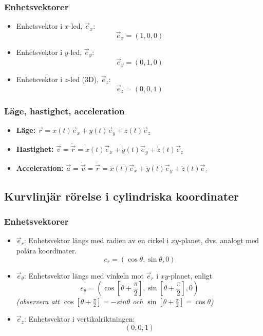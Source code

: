 \documentclass{article}
\newenvironment{ankiflashcard}[1]{}{}
\begin{document}
\begin{paracol}{2}
\subsubsection{Enhetsvektorer}
\begin{itemize}
    \item Enhetsvektor i $x$-led, $\vec e_x$:
    $$\vec e_x = (1,0,0)$$
    \item Enhetsvektor i $y$-led, $\vec e_y$:
    $$\vec e_y = (0,1,0)$$
    \item Enhetsvektor i $z$-led (3D), $\vec e_z$:
    $$\vec e_z = (0,0,1)$$ 
\end{itemize}
\subsubsection{Läge, hastighet, acceleration}

\begin{ankiflashcard}{Definera läge, hastighet och acceleration i kartesiska koordinater.}
    
\begin{itemize}
    \item \textbf{Läge:} $\vec r = x(t)\vec e_x + y(t)\vec e_y + z(t)\vec e_z$
    \item \textbf{Hastighet:} $\vec v = \dot{\vec r} = \dot x(t)\vec e_x + \dot y(t)\vec e_y + \dot z(t)\vec e_z$
    \item \textbf{Acceleration:} $\vec a = \dot{\vec v} = \ddot{\vec r} = \ddot x(t)\vec e_x + \ddot y(t)\vec e_y + \ddot z(t)\vec e_z$
\end{itemize}
\end{ankiflashcard}

\subsection{Kurvlinjär rörelse i cylindriska koordinater}

\begin{ankiflashcard}{Definiera enhetsvektorerna i cylinderkoordinater.}
\subsubsection{Enhetsvektorer}

\begin{itemize}
    \item $\vec e_r$: Enhetsvektor längs med radien av en cirkel i $xy$-planet, dvs. analogt med polära koordinater.
    $$e_r = (\cos \theta, \sin \theta, 0)$$
    \item $\vec e_\theta$: Enhetsvektor längs med vinkeln mot $\vec e_r$ i $xy$-planet, enligt
    $$e_\theta = (\cos \left[\theta + \frac{\pi}{2}\right], \sin \left[\theta + \frac{\pi}{2}\right], 0)$$
    \textit{(observera att $\cos \left[\theta + \frac{\pi}{2}\right]=-sin \theta$ och $\sin \left[\theta + \frac{\pi}{2}\right]=\cos \theta$)}
    \item $\vec e_z$: Enhetsvektor i vertikalriktningen: $$(0,0,1)$$
\end{itemize}
\end{ankiflashcard}


\end{paracol}
\end{document}
